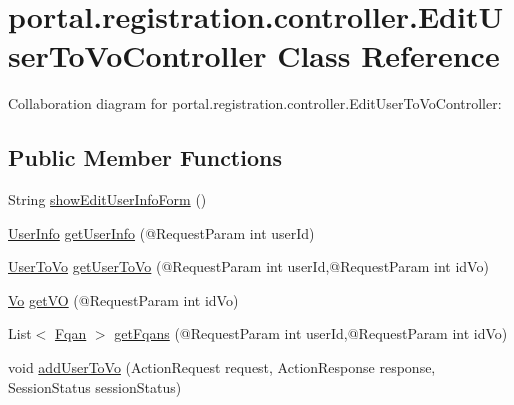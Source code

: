 \hypertarget{classportal_1_1registration_1_1controller_1_1EditUserToVoController}{
\section{portal.registration.controller.EditUserToVoController Class Reference}
\label{classportal_1_1registration_1_1controller_1_1EditUserToVoController}
}


Collaboration diagram for portal.registration.controller.EditUserToVoController:
\subsection*{Public Member Functions}
\begin{DoxyCompactItemize}
\item 
String \hyperlink{classportal_1_1registration_1_1controller_1_1EditUserToVoController_a6fb863621d3ccd57b7c228d642167c79}{showEditUserInfoForm} ()
\item 
\hyperlink{classportal_1_1registration_1_1domain_1_1UserInfo}{UserInfo} \hyperlink{classportal_1_1registration_1_1controller_1_1EditUserToVoController_a7e131f83378f7f675880aafc3deed55c}{getUserInfo} (@RequestParam int userId)
\item 
\hyperlink{classportal_1_1registration_1_1domain_1_1UserToVo}{UserToVo} \hyperlink{classportal_1_1registration_1_1controller_1_1EditUserToVoController_ab5f3b0f3201e6fead40534252c9f6836}{getUserToVo} (@RequestParam int userId,@RequestParam int idVo)
\item 
\hyperlink{classportal_1_1registration_1_1domain_1_1Vo}{Vo} \hyperlink{classportal_1_1registration_1_1controller_1_1EditUserToVoController_a47df37128ba11b11fc01d8875e33c7ef}{getVO} (@RequestParam int idVo)
\item 
List$<$ \hyperlink{classportal_1_1registration_1_1domain_1_1Fqan}{Fqan} $>$ \hyperlink{classportal_1_1registration_1_1controller_1_1EditUserToVoController_a4f02e82cbea1050780b3cf7e020f6a4d}{getFqans} (@RequestParam int userId,@RequestParam int idVo)
\item 
void \hyperlink{classportal_1_1registration_1_1controller_1_1EditUserToVoController_aeb87d1e842bf381602343632f23f58e2}{addUserToVo} (ActionRequest request, ActionResponse response, SessionStatus sessionStatus)
\end{DoxyCompactItemize}
